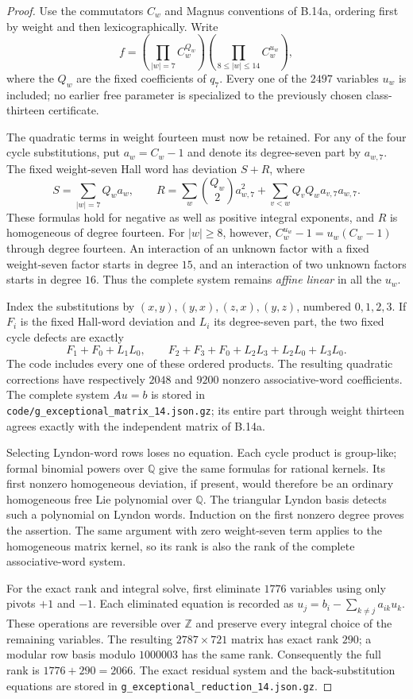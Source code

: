\begin{proof}
Use the commutators $C_w$ and Magnus conventions of B.14a,
ordering first by weight and then lexicographically. Write
\[
 f=\left(\prod_{|w|=7}C_w^{Q_w}\right)
       \left(\prod_{8\leq |w|\leq14}C_w^{u_w}\right),
\]
where the $Q_w$ are the fixed coefficients of $q_7$.
Every one of the $2497$ variables $u_w$ is included; no earlier
free parameter is specialized to the previously chosen
class-thirteen certificate.

The quadratic terms in weight fourteen must now be retained.
For any of the four cycle substitutions, put $a_w=C_w-1$
and denote its degree-seven part by $a_{w,7}$. The fixed
weight-seven Hall word has deviation $S+R$, where
\[
 S=\sum_{|w|=7}Q_wa_w,
 \qquad
 R=\sum_w\binom{Q_w}{2}a_{w,7}^2
       +\sum_{v<w}Q_vQ_wa_{v,7}a_{w,7}.
\]
These formulas hold for negative as well as positive integral
exponents, and $R$ is homogeneous of degree fourteen. For
$|w|\geq8$, however,
$C_w^{u_w}-1=u_w(C_w-1)$ through degree fourteen.
An interaction of an unknown factor with a fixed weight-seven
factor starts in degree $15$, and an interaction of two
unknown factors starts in degree $16$. Thus the complete
system remains \emph{affine linear} in all the $u_w$.

Index the substitutions by
$(x,y),(y,x),(z,x),(y,z)$, numbered $0,1,2,3$.
If $F_i$ is the fixed Hall-word deviation and $L_i$ its
degree-seven part, the two fixed cycle defects are exactly
\[
 F_1+F_0+L_1L_0,\qquad
 F_2+F_3+F_0+L_2L_3+L_2L_0+L_3L_0.
\]
The code includes every one of these ordered products.
The resulting quadratic corrections have respectively
$2048$ and $9200$ nonzero associative-word coefficients.
The complete system $Au=b$ is stored in
\texttt{code/g\_exceptional\_matrix\_14.json.gz}; its
entire part through weight thirteen agrees exactly with the
independent matrix of B.14a.

Selecting Lyndon-word rows loses no equation. Each cycle
product is group-like; formal binomial powers over
$\mathbb Q$ give the same formulas for rational kernels.
Its first nonzero homogeneous
deviation, if present, would therefore be an ordinary
homogeneous free Lie polynomial over $\mathbb Q$.
The triangular Lyndon basis detects such a polynomial on
Lyndon words. Induction on the first nonzero degree proves
the assertion. The same argument with zero weight-seven
term applies to the homogeneous matrix kernel, so its
rank is also the rank of the complete associative-word
system.

For the exact rank and integral solve, first eliminate
$1776$ variables using only pivots $+1$ and $-1$.
Each eliminated equation is recorded as
$u_j=b_i-\sum_{k\ne j}a_{ik}u_k$.
These operations are reversible over $\mathbb Z$ and
preserve every integral choice of the remaining variables.
The resulting $2787\times721$ matrix has exact rank $290$;
a modular row basis modulo $1000003$ has the same rank.
Consequently the full rank is $1776+290=2066$.
The exact residual system and the back-substitution equations
are stored in
\texttt{g\_exceptional\_reduction\_14.json.gz}.


\end{proof}

